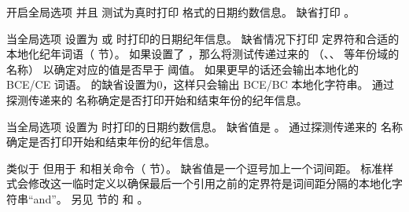 \begin{ltxsyntax}
开启全局选项  并且  测试为真时打印
 格式的日期约数信息。
缺省打印 。

当全局选项  设置为  或  时打印的日期纪年信息。
缺省情况下打印  定界符和合适的本地化纪年词语（ 节）。
如果设置了 ，那么将测试传递过来的 
（、、 等年份域的名称）
以确定对应的值是否早于  阈值。
如果更早的话还会输出本地化的 BCE/CE 词语。
 的缺省设置为0，这样只会输出 BCE/BC 本地化字符串。
通过探测传递来的  名称确定是否打印开始和结束年份的纪年信息。

当全局选项  设置为  时打印的日期约数信息。
缺省值是 。
通过探测传递来的  名称确定是否打印开始和结束年份的纪年信息。

类似于  但用于  和相关命令（ 节）。
缺省值是一个逗号加上一个词间距。
标准样式会修改这一临时定义以确保最后一个引用之前的定界符是词间距分隔的本地化字符串“and”。
另见  节的  和 。


\end{ltxsyntax}

